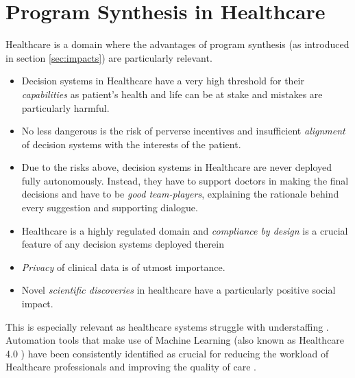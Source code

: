 \section{Program Synthesis in Healthcare}

Healthcare is a domain where the advantages of program synthesis (as introduced in section \ref{sec:impacts}) are particularly relevant.
\begin{itemize}
    \item Decision systems in Healthcare have a very high threshold for their \emph{capabilities} as patient's health and life can be at stake and mistakes are particularly harmful.
    \item No less dangerous is the risk of perverse incentives and insufficient \emph{alignment} of decision systems with the interests of the patient.
    \item Due to the risks above, decision systems in Healthcare are never deployed fully autonomously. Instead, they have to support doctors in making the final decisions and have to be \emph{good team-players}, explaining the rationale behind every suggestion and supporting dialogue.
    \item Healthcare is a highly regulated domain and \emph{compliance by design} is a crucial feature of any decision systems deployed therein
    \item \emph{Privacy} of clinical data is of utmost importance.
    \item Novel \emph{scientific discoveries} in healthcare have a particularly positive social impact.
\end{itemize}

This is especially relevant as healthcare systems struggle with understaffing \cite{ashleyy.metcalfHospitalUnitUnderstaffing2016,SurveyShowsHidden1993,UnderstaffingSignificantIssue2012,campbell_universal_2013, hudsonUnderstaffing2015, mercerMessageEditorinChief2008, r.stanleyUnderstaffedOverwhelmed2010, munnUnderstaffingWardsCompromising2017, thelancetHealthcareSystemStaffing2018}. Automation tools that make use of Machine Learning (also known as Healthcare 4.0 \cite{tortorellaHealthcareTrendsChallenges2020}) have been consistently identified as crucial for reducing the workload of Healthcare professionals and improving the quality of care \cite{agrawalMachineLearningHealthcare2020, deviDesignImplementationAdvanced2022, g.kumarSurveyMachineLearning2016, ganguliMachineLearningPursuit2020, maityMachineLearningImproved2017, mitraMachineLearningHealthcare2021, pianykhImprovingHealthcareOperations2020, xhaferraRoleMachineLearning2022}.

